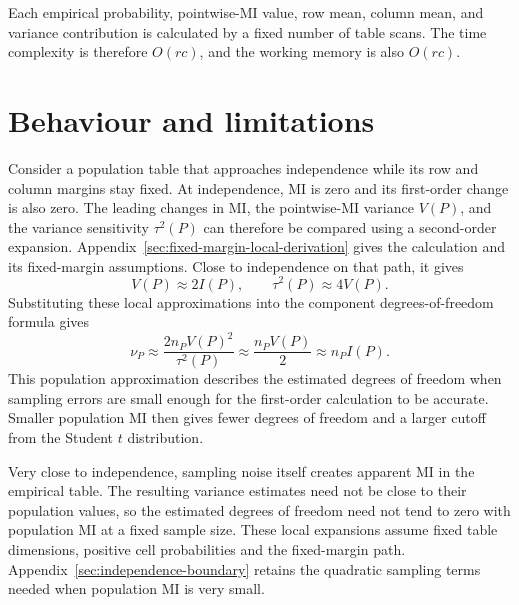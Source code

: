 Each empirical probability, pointwise-MI value, row mean, column mean, and
variance contribution is calculated by a fixed number of table scans. The
time complexity is therefore \(O(rc)\), and the working memory is also
\(O(rc)\).

\section{Behaviour and limitations}
\label{sec:near-independence-mechanism}


Consider a population table that
approaches independence while its row and column margins stay fixed. At
independence, MI is zero and its first-order change is also zero. The
leading changes in MI, the pointwise-MI variance \(V(P)\), and the variance
sensitivity \(\tau^2(P)\) can therefore be compared using a second-order
expansion. Appendix~\ref{sec:fixed-margin-local-derivation} gives the
calculation and its fixed-margin assumptions. Close to independence on
that path, it gives
\begin{equation}
 V(P)\approx 2I(P),
 \qquad \tau^2(P)\approx4V(P).
 \label{eq:near-independent-moments}
\end{equation}
Substituting these local approximations into
the component degrees-of-freedom formula gives
\begin{equation}
 \nu_P\approx\frac{2n_PV(P)^2}{\tau^2(P)}
 \approx\frac{n_PV(P)}{2}
 \approx n_PI(P).
 \label{eq:near-independent-df}
\end{equation}
This population approximation describes the estimated degrees of freedom
when sampling errors are small enough for the first-order calculation to
be accurate. Smaller population MI then gives fewer degrees of freedom
and a larger cutoff from the Student \(t\) distribution.

Very close to independence, sampling noise itself creates apparent MI in
the empirical table. The resulting variance estimates need not be close to
their population values, so the estimated degrees of freedom need not tend
to zero with population MI at a fixed sample size. These local expansions
assume fixed table dimensions, positive cell probabilities and the
fixed-margin path. Appendix~\ref{sec:independence-boundary} retains the
quadratic sampling terms needed when population MI is very small.

